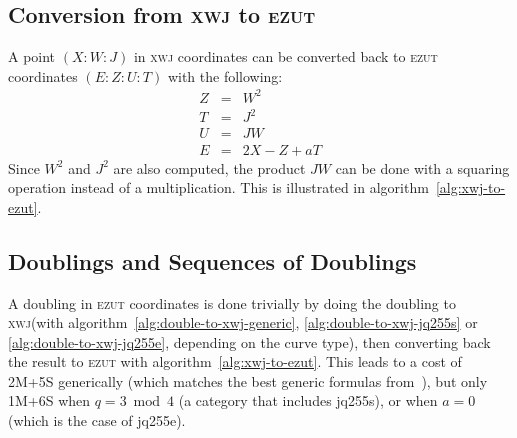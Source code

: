 \documentclass{llncs}
\newcommand{\cC}{\mathcal{C}}
\newcommand{\ezut}{\textsc{ezut}\xspace}
\newcommand{\xwj}{\textsc{xwj}\xspace}
\begin{document}
\begin{algorithm}[H]
    \caption{\ \ Doubling \ezut to \xwj on $\cC(0,b)$ (e.g. jq255e) (cost: 1M+3S)}\label{alg:double-to-xwj-jq255e}
    \begin{algorithmic}[1]
        \Require{$P = (E{:}Z{:}U{:}T) \in \cC(-1,1/2)$}
    \end{algorithmic}
\end{algorithm}

\subsection{Conversion from \xwj to \ezut}

A point $(X{:}W{:}J)$ in \xwj coordinates can be converted back to \ezut
coordinates $(E{:}Z{:}U{:}T)$ with the following:
\begin{eqnarray*}
    Z &=& W^2 \\
    T &=& J^2 \\
    U &=& JW \\
    E &=& 2X - Z + aT
\end{eqnarray*}
Since $W^2$ and $J^2$ are also computed, the product $JW$ can be done
with a squaring operation instead of a multiplication. This is illustrated
in algorithm~\ref{alg:xwj-to-ezut}.

\begin{algorithm}[H]
    \caption{\ \ Conversion from \xwj to \ezut (cost: 3S)}\label{alg:xwj-to-ezut}
    \begin{algorithmic}[1]
    \end{algorithmic}
\end{algorithm}

\subsection{Doublings and Sequences of Doublings}

A doubling in \ezut coordinates is done trivially by doing the doubling
to \xwj (with algorithm~\ref{alg:double-to-xwj-generic},
\ref{alg:double-to-xwj-jq255s} or \ref{alg:double-to-xwj-jq255e},
depending on the curve type), then converting back the result to \ezut
with algorithm~\ref{alg:xwj-to-ezut}. This leads to a cost of 2M+5S
generically (which matches the best generic formulas
from~\cite{HisWonCarDaw2009}), but only 1M+6S when $q = 3\bmod 4$ (a
category that includes jq255s), or when $a = 0$ (which is the case of
jq255e).
\end{document}
